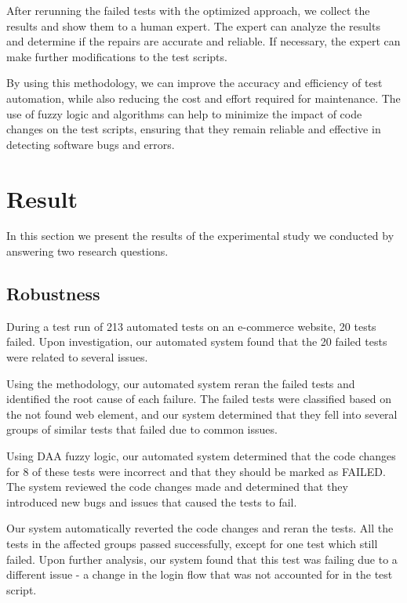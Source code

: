 \documentclass{article}
\begin{document}
After rerunning the failed tests with the optimized approach, we collect the results and show them to a human expert. The expert can analyze the results and determine if the repairs are accurate and reliable. If necessary, the expert can make further modifications to the test scripts.

By using this methodology, we can improve the accuracy and efficiency of test automation, while also reducing the cost and effort required for maintenance. The use of fuzzy logic and algorithms can help to minimize the impact of code changes on the test scripts, ensuring that they remain reliable and effective in detecting software bugs and errors.



\maketitle

\section{Result}

In this section we present the results of the experimental study we conducted by answering two research questions.

\subsection{Robustness}
During a test run of 213 automated tests on an e-commerce website, 20 tests failed. Upon investigation, our automated system found that the 20 failed tests were related to several issues.

Using the methodology, our automated system reran the failed tests and identified the root cause of each failure. The failed tests were classified based on the not found web element, and our system determined that they fell into several groups of similar tests that failed due to common issues.

Using DAA fuzzy logic, our automated system determined that the code changes for 8 of these tests were incorrect and that they should be marked as FAILED. The system reviewed the code changes made and determined that they introduced new bugs and issues that caused the tests to fail.

Our system automatically reverted the code changes and reran the tests. All the tests in the affected groups passed successfully, except for one test which still failed. Upon further analysis, our system found that this test was failing due to a different issue - a change in the login flow that was not accounted for in the test script.
\end{document}
